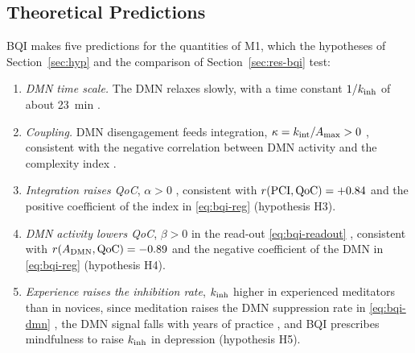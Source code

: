 \subsection{Theoretical Predictions}
\label{sec:theory-pred}
BQI makes five predictions for the quantities of M1, which the hypotheses of Section~\ref{sec:hyp} and the comparison of Section~\ref{sec:res-bqi} test:
\begin{enumerate}
  \item[T1] \emph{DMN time scale.} The DMN relaxes slowly, with a time constant $1/k_{\mathrm{inh}}$ of about 23~min \cite[Table~5]{BQI}.
  \item[T2] \emph{Coupling.} DMN disengagement feeds integration, $\kappa=k_{\mathrm{int}}/A_{\max}>0$ \cite[eq.~(53)]{BQI}, consistent with the negative correlation between DMN activity and the complexity index \cite[eq.~(58) and Remark~6.1]{BQI}.
  \item[T3] \emph{Integration raises QoC}, $\alpha>0$ \cite[Table~5]{BQI}, consistent with $r(\mathrm{PCI},\mathrm{QoC})=+0.84$ and the positive coefficient of the index in \eqref{eq:bqi-reg} \cite[eqs.~(58)--(59)]{BQI} (hypothesis H3).
  \item[T4] \emph{DMN activity lowers QoC}, $\beta>0$ in the read-out \eqref{eq:bqi-readout} \cite[Table~5]{BQI}, consistent with $r(A_{\mathrm{DMN}},\mathrm{QoC})=-0.89$ and the negative coefficient of the DMN in \eqref{eq:bqi-reg} \cite[eqs.~(58)--(59)]{BQI} (hypothesis H4).
  \item[T5] \emph{Experience raises the inhibition rate}, $k_{\mathrm{inh}}$ higher in experienced meditators than in novices, since meditation raises the DMN suppression rate in \eqref{eq:bqi-dmn} \cite[eq.~(51)]{BQI}, the DMN signal falls with years of practice \cite[Table~7 and Sec.~7.5]{BQI}, and BQI prescribes mindfulness to raise $k_{\mathrm{inh}}$ in depression \cite[Table~10]{BQI} (hypothesis H5).
\end{enumerate}
